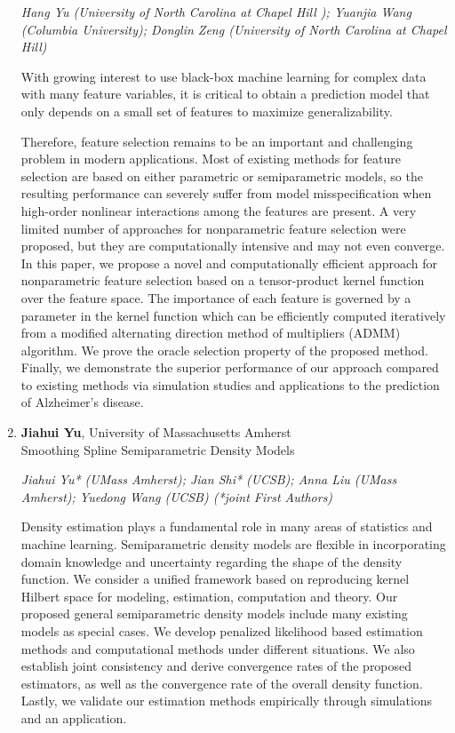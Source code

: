 \begin{enumerate}
\emph{\footnotesize Hang Yu (University of North Carolina at Chapel Hill ); Yuanjia Wang (Columbia University); Donglin Zeng (University of North Carolina at Chapel Hill)}

With growing interest to use black-box machine learning for complex data with many feature variables, it is critical to obtain a prediction model that only depends on a small set of features to maximize  generalizability.

Therefore,  feature selection remains to be an important and challenging problem in modern applications. Most of existing methods for feature selection are based on either parametric or semiparametric models, so the resulting performance can severely suffer from model misspecification when high-order nonlinear interactions among the features are present.  A very limited number of approaches for nonparametric feature selection were proposed, but they are  computationally intensive and may not even converge. In this paper, we propose a novel and computationally efficient approach for nonparametric feature selection based on a tensor-product kernel function over the feature space. The importance of each feature is governed by a parameter in the kernel function which can be efficiently computed iteratively from a modified alternating direction method of multipliers (ADMM) algorithm. We prove the oracle selection property of the proposed method. Finally, we demonstrate the superior performance of our approach compared to existing methods via  simulation studies and applications to the prediction of Alzheimer's disease.

\item \textbf{Jiahui Yu}, University of Massachusetts Amherst \\
Smoothing Spline Semiparametric Density Models

\emph{\footnotesize Jiahui Yu* (UMass Amherst); Jian Shi* (UCSB); Anna Liu (UMass Amherst); Yuedong Wang (UCSB) (*joint First Authors)}

Density estimation plays a fundamental role in many areas of statistics and machine learning. Semiparametric density models are flexible in incorporating domain knowledge and uncertainty regarding the shape of the density function. We consider a unified framework based on reproducing kernel Hilbert space for modeling, estimation, computation and theory. Our proposed general semiparametric density models include many existing models as special cases. We develop penalized likelihood based estimation methods and computational methods under different situations. We also establish joint consistency and derive convergence rates of the proposed estimators, as well as the convergence rate of the overall density function. Lastly, we validate our estimation methods empirically through simulations and an application.


\end{enumerate}
